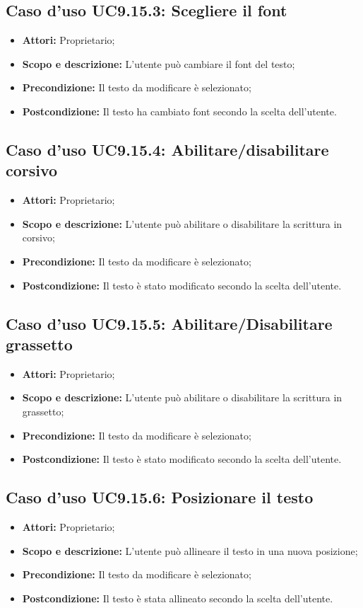 \subsection{Caso d'uso UC9.15.3: Scegliere il font}
\begin{itemize}
	\item \textbf{Attori:} Proprietario;
	\item \textbf{Scopo e descrizione:} L'utente può cambiare il \gls{font} del testo;
	\item \textbf{Precondizione:} Il testo da modificare è selezionato;
	\item \textbf{Postcondizione:} Il testo ha cambiato \gls{font} secondo la scelta dell'utente.
\end{itemize}

\subsection{Caso d'uso UC9.15.4: Abilitare/disabilitare corsivo}
\begin{itemize}
	\item \textbf{Attori:} Proprietario;
	\item \textbf{Scopo e descrizione:} L'utente può abilitare o disabilitare la scrittura in corsivo;
	\item \textbf{Precondizione:} Il testo da modificare è selezionato;
	\item \textbf{Postcondizione:} Il testo è stato modificato secondo la scelta dell'utente.
\end{itemize}

\subsection{Caso d'uso UC9.15.5: Abilitare/Disabilitare grassetto}
\begin{itemize}
	\item \textbf{Attori:} Proprietario;
	\item \textbf{Scopo e descrizione:} L'utente può abilitare o disabilitare la scrittura in grassetto;
	\item \textbf{Precondizione:} Il testo da modificare è selezionato;
	\item \textbf{Postcondizione:} Il testo è stato modificato secondo la scelta dell'utente.
\end{itemize}

\subsection{Caso d'uso UC9.15.6: Posizionare il testo}
\begin{itemize}
	\item \textbf{Attori:} Proprietario;
	\item \textbf{Scopo e descrizione:} L'utente può allineare il testo in una nuova posizione;
	\item \textbf{Precondizione:} Il testo da modificare è selezionato;
	\item \textbf{Postcondizione:} Il testo è stata allineato secondo la scelta dell'utente.
\end{itemize}

